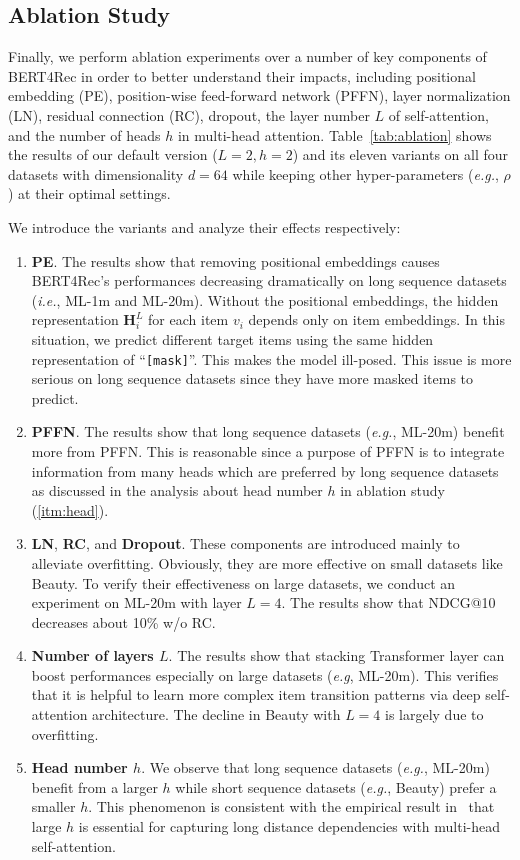 \subsection{Ablation Study}

Finally, we perform ablation experiments over a number of key components of BERT4Rec in order to better understand their impacts, including positional embedding (PE), position-wise feed-forward network (PFFN), layer normalization (LN), residual connection (RC), dropout, the layer number $L$ of self-attention, and the number of heads $h$ in multi-head attention. 
Table~\ref{tab:ablation} shows the results of our default version ($L=2, h=2$) and its eleven variants on all four datasets with dimensionality $d=64$ while keeping other hyper-parameters (\textit{e.g.}, $\rho$) at their optimal settings. 

We introduce the variants and analyze their effects respectively:

\begin{enumerate}
  \item \textbf{PE}. The results show that removing positional embeddings causes BERT4Rec's performances decreasing dramatically on long sequence datasets (\textit{i.e.}, ML-1m and ML-20m). Without the positional embeddings, the hidden representation $\bm{H}_i^L$ for each item $v_i$ depends only on item embeddings. In this situation, we predict different target items using the same hidden representation of ``\texttt{[mask]}''. This makes the model ill-posed. This issue is more serious on long sequence datasets since they have more masked items to predict.
  \item \textbf{PFFN}. The results show that long sequence datasets (\textit{e.g.}, ML-20m) benefit more from PFFN. This is reasonable since a purpose of PFFN is to integrate information from many heads which are preferred by long sequence datasets as discussed in the analysis about head number $h$ in ablation study (\ref{itm:head}). 
  \item \textbf{LN}, \textbf{RC}, and \textbf{Dropout}. These components are introduced mainly to alleviate overfitting. Obviously, they are more effective on small datasets like Beauty. To verify their effectiveness on large datasets, we conduct an experiment on ML-20m with layer $L{=}4$. The results show that NDCG@10 decreases about 10\% w/o RC.
  \item \textbf{Number of layers $L$}. The results show that stacking Transformer layer can boost performances especially on large datasets (\textit{e.g}, ML-20m). This verifies that it is helpful to learn more complex item transition patterns via deep self-attention architecture. The decline in Beauty with $L=4$ is largely due to overfitting.
  \item\label{itm:head} \textbf{Head number $h$}. We observe that long sequence datasets (\textit{e.g.}, ML-20m) benefit from a larger $h$ while short sequence datasets (\textit{e.g.}, Beauty) prefer a smaller $h$. This phenomenon is consistent with the empirical result in~\cite{Tang:EMNLP2018:Why} that large $h$ is essential for capturing long distance dependencies with multi-head self-attention.
\end{enumerate}

